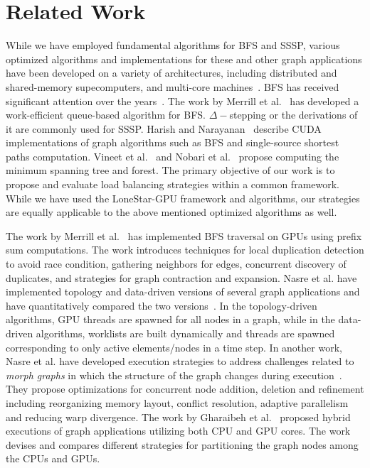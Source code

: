 \section{Related Work}
\label{related}

While we have employed fundamental algorithms for BFS and SSSP, various optimized algorithms and implementations for these and other graph applications have been developed on a variety of architectures, including distributed and shared-memory supecomputers, and multi-core machines~\cite{madduri-fasterparallelbc-ipdps2009, kulkarni-lonestar-ispass2009, agarwal-scalablegraphexploration-sc2010, buluc-parallelBFS-sc2011, ediger-graphct-tpds2013,yoo05, bader06a, kulkarni07}. BFS has received significant attention over the years~\cite{Luo:2010:EGI:1837274.1837289,hongBFS,merrill-scalablegputraversal-ppopp2012,gharaibeh12}. The work by Merrill et al.~\cite{merrill-scalablegputraversal-ppopp2012} has developed a work-efficient queue-based algorithm for BFS. $\Delta-$stepping or the derivations of it \cite{meyer-stepping-ja2003, venkatesan-scalablesssp-ipdps2014} are commonly used for SSSP.  Harish and Narayanan~\cite{harish07} describe CUDA implementations of graph algorithms such as BFS and single-source shortest paths computation.  Vineet et al.~\cite{vineet09} and Nobari et al.~\cite{nobari12} propose computing the minimum spanning tree and forest. The primary objective of our work is to propose and evaluate load balancing strategies within a common framework. While we have used the LoneStar-GPU framework and algorithms, our strategies are equally applicable to the above mentioned optimized algorithms as well.

The work by Merrill et al.~\cite{merrill-scalablegputraversal-ppopp2012} has implemented BFS traversal on GPUs using prefix sum computations. The work introduces techniques for local duplication detection to avoid race condition, gathering neighbors for edges, concurrent discovery of duplicates, and strategies for graph contraction and expansion.
Nasre et al. have implemented topology and data-driven versions of several graph applications and have quantitatively compared the two versions~\cite{nasre-datavstoplogy-ipdps2013}. In the topology-driven algorithms, GPU threads are spawned for all nodes in a graph, while in the data-driven algorithms, worklists are built dynamically and threads are spawned corresponding to only active elements/nodes in a time step. In another work, Nasre et al. have developed execution strategies to address challenges related to {\em morph graphs} in which the structure of the graph changes during execution~\cite{nasre-morphgpus-ppopp2013}. They propose optimizations for concurrent node addition, deletion and refinement including reorganizing memory layout, conflict resolution, adaptive parallelism and reducing warp divergence.
The work by Gharaibeh et al.~\cite{gharaibeh-graphsgpus-ipdps2013}  proposed hybrid executions of graph applications utilizing both CPU and GPU cores. The work devises and compares different strategies for partitioning the graph nodes among the CPUs and GPUs.

